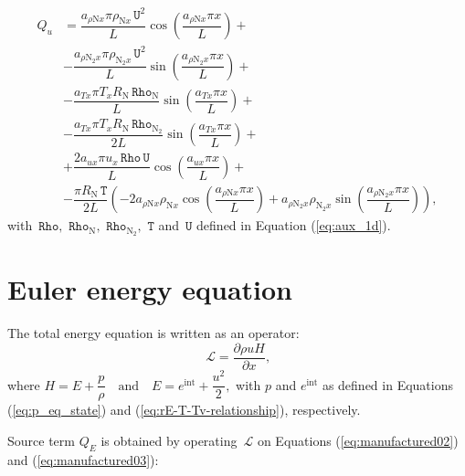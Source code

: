 \documentclass[10pt]{article}
\newcommand{\diff}[2] {\dfrac{\partial #1 }{\partial #2}}
\newcommand{\Lo}{\,\mathcal{L}}
\newcommand{\Rho}{\,\mathtt{Rho}}
\newcommand{\T}{\,\mathtt{T}}
\newcommand{\U}{\,\mathtt{U}}
\begin{document}
\begin{equation}
\begin{split}
Q_u &= \dfrac{a_{ \rho \text{N} x} \pi \rho_{\text{N}x} \U^2 }{L}\cos\left(\dfrac{a_{ \rho \text{N} x} \pi x}{L}\right)+\\
&-\dfrac{a_{ \rho \text{N}_2 x} \pi \rho_{\text{N}_2 x} \U^2 }{L}\sin\left(\dfrac{a_{ \rho \text{N}_2 x} \pi x}{L}\right)+\\
&-\dfrac{a_{Tx} \pi T_x R_\text{N} \Rho_\text{N} }{L}\sin\left(\dfrac{a_{Tx} \pi x}{L}\right)+\\
&-\dfrac{a_{Tx} \pi T_x R_\text{N} \Rho_{\text{N}_2} }{2L}\sin\left(\dfrac{a_{Tx} \pi x}{L}\right)+\\
&+\dfrac{2 a_{ux} \pi u_x \Rho \U }{L}\cos\left(\dfrac{a_{ux} \pi x}{L}\right)+\\
&-\dfrac{\pi R_\text{N} \T}{2L} \left(-2 a_{ \rho \text{N} x} \rho_{\text{N}x} \cos\left(\dfrac{a_{ \rho \text{N} x} \pi x}{L}\right)+a_{ \rho \text{N}_2 x} \rho_{\text{N}_2 x} \sin\left(\dfrac{a_{ \rho \text{N}_2 x} \pi x}{L}\right)\right),
\end{split}
\end{equation}
with $\Rho,\,\Rho_{\text{N}},\,\Rho_{\text{N}_2},\, \T$ and $\U$ defined in Equation (\ref{eq:aux_1d}).

\section{Euler energy equation}
The total energy equation is written as an operator:
\begin{equation*}
 \label{eq:euler1d_14}
\Lo =\diff{\rho u H}{x} ,
\end{equation*}
where $H= E+ \dfrac{p}{\rho} \quad \mbox{and}\quad E=e^{\text{int}} + \dfrac{u^2 }{2} ,$ with $p$ and $e^{\text{int}}$ as defined in Equations (\ref{eq:p_eq_state}) and (\ref{eq:rE-T-Tv-relationship}), respectively.

Source term $Q_E$ is obtained by operating $\Lo$ on Equations (\ref{eq:manufactured02}) and (\ref{eq:manufactured03}):
\end{document}

